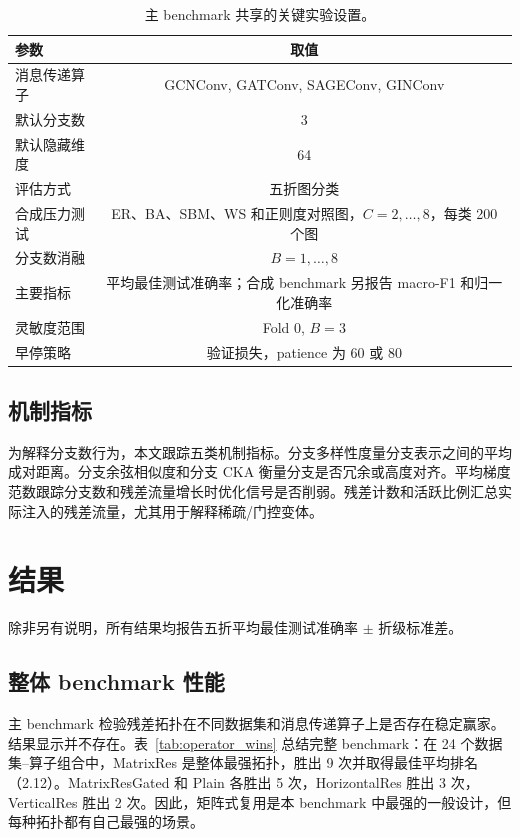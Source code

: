 \documentclass[UTF8,10pt]{ctexart}
\begin{document}
\begin{table}[h]
\centering
\small
\caption{主 benchmark 共享的关键实验设置。}
\label{tab:hyperparams}
\begin{tabular}{l c}
\toprule
参数 & 取值 \\
\midrule
消息传递算子 & GCNConv, GATConv, SAGEConv, GINConv \\
默认分支数 & 3 \\
默认隐藏维度 & 64 \\
评估方式 & 五折图分类 \\
合成压力测试 & ER、BA、SBM、WS 和正则度对照图，\(C=2,\ldots,8\)，每类 200 个图 \\
分支数消融 & \(B=1,\ldots,8\) \\
主要指标 & 平均最佳测试准确率；合成 benchmark 另报告 macro-F1 和归一化准确率 \\
灵敏度范围 & Fold 0, \(B=3\) \\
早停策略 & 验证损失，patience 为 60 或 80 \\
\bottomrule
\end{tabular}
\end{table}

\subsection{机制指标}

为解释分支数行为，本文跟踪五类机制指标。分支多样性度量分支表示之间的平均成对距离。分支余弦相似度和分支 CKA 衡量分支是否冗余或高度对齐。平均梯度范数跟踪分支数和残差流量增长时优化信号是否削弱。残差计数和活跃比例汇总实际注入的残差流量，尤其用于解释稀疏/门控变体。

\section{结果}
\label{sec:results}

除非另有说明，所有结果均报告五折平均最佳测试准确率 \(\pm\) 折级标准差。

\subsection{整体 benchmark 性能}

主 benchmark 检验残差拓扑在不同数据集和消息传递算子上是否存在稳定赢家。结果显示并不存在。表~\ref{tab:operator_wins} 总结完整 benchmark：在 24 个数据集--算子组合中，MatrixRes 是整体最强拓扑，胜出 9 次并取得最佳平均排名（2.12）。MatrixResGated 和 Plain 各胜出 5 次，HorizontalRes 胜出 3 次，VerticalRes 胜出 2 次。因此，矩阵式复用是本 benchmark 中最强的一般设计，但每种拓扑都有自己最强的场景。
\end{document}
